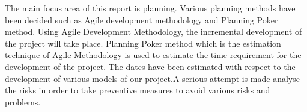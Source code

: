 
The main focus area of this report is planning. Various planning methods have been decided such as Agile development methodology and Planning Poker method.
Using Agile Development Methodology, the incremental  development of the project will take place. Planning Poker method  which is the estimation technique of Agile Methodology is used to estimate the time requirement for the development of the project. The dates have been estimated with respect to the development of various models of our project.A serious attempt is made analyse the risks  in order to take preventive measures to avoid various risks and problems. 
